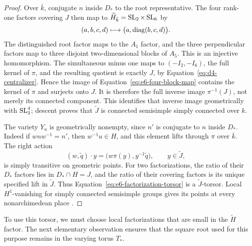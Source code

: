 \begin{proof}
Over $\bar k$, conjugate $n$ inside $D_*$ to the root representative.
The four rank-one factors covering $J$ then map to
$\widetilde H_{\bar k}=\operatorname{SL}_2\times\operatorname{SL}_6$ by
\begin{equation}\label{eq:e6-four-block-map}
 (a,b,c,d)\longmapsto\bigl(a,\operatorname{diag}(b,c,d)\bigr).
\end{equation}
The distinguished root factor maps to the $A_1$ factor, and the three
perpendicular factors map to three disjoint two-dimensional blocks of
$A_5$.  This is an injective homomorphism.  The simultaneous minus one
maps to $(-I_2,-I_6)$, the full kernel of $\pi$, and the resulting
quotient is exactly $J$, by Equation~\eqref{eq:d4-centralizer}.  Hence
the image of Equation~\eqref{eq:e6-four-block-map} contains the kernel
of $\pi$ and surjects onto $J$.  It is therefore the full inverse image
$\pi^{-1}(J)$, not merely its connected component.  This identifies that
inverse image geometrically with $\operatorname{SL}_2^4$; descent proves that
$\widetilde J$ is connected semisimple simply connected over $k$.

The variety $Y_u$ is geometrically nonempty, since $n'$ is conjugate to
$n$ inside $D_*$.  Indeed if $wnw^{-1}=n'$, then $w^{-1}u\in H$, and
this element lifts through $\pi$ over $\bar k$.  The right action
\[
 (w,\widetilde q)\cdot y
       =\bigl(w\pi(y),y^{-1}\widetilde q\bigr),
       \qquad y\in\widetilde J,
\]
is simply transitive on geometric points.  For two factorizations, the
ratio of their $D_*$ factors lies in $D_*\cap H=J$, and the ratio of
their covering factors is its unique specified lift in
$\widetilde J$.  Thus Equation~\eqref{eq:e6-factorization-torsor} is a
$\widetilde J$-torsor.  Local $H^1$-vanishing for simply connected
semisimple groups gives its points at every nonarchimedean place
\cite{PRbook}.
\end{proof}

To use this torsor, we must choose local factorizations that are small
in the $\widetilde H$ factor.  The next elementary observation ensures
that the square root used for this purpose remains in the varying torus
$T_*$.

